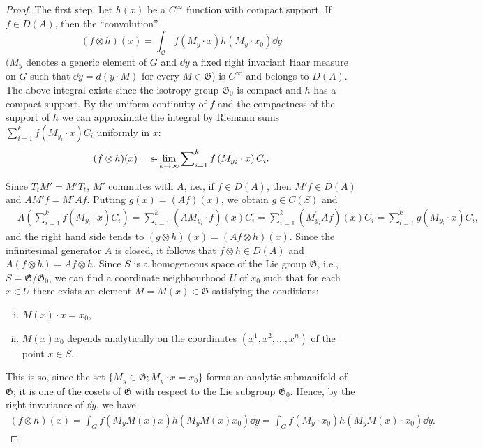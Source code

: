 \begin{proof}
 The first step. Let $h(x)$ be a $C^\infty$ function with compact support. If $f \in D(A)$, then the ``convolution'' 
\begin{equation}\label{eq:XIII.5.9}
(f \otimes h) (x) = \int_ {\mathfrak {G}} f (M _{y} \cdot x) h (M _{y} \cdot x _{0}) \dd y
\end{equation}
$(M_{y}$ denotes a generic element of $G$ and $\dd y$ a fixed right invariant Haar measure on $G$ such that $\dd y = d(y \cdot M)$ for every $M \in \mathfrak{G}$) is $C^{\infty}$ and belongs to $D(A)$. The above integral exists since the isotropy group $\mathfrak{G}_{0}$ is compact and $h$ has a compact support. By the uniform continuity of $f$ and the compactness of the support of $h$ we can approximate the integral by Riemann sums $\sum\limits_{i=1}^{k} f(M_{y_{i}} \cdot x) C_{i}$ uniformly in $x$: 
\[
(f \otimes h) (x) = \text{s-}\lim _{k \rightarrow \infty} \sum\nolimits_{i=1} ^{k} f \left(M _ {y _{i}} \cdot x\right) C _{i}. \]

Since $T_{t}M' = M'T_{t}$, $M'$ commutes with $A$, i.e., if $f \in D(A)$, then $M'f \in D(A)$ and $AM'f = M'Af$. Putting $g(x) = (Af)(x)$, we obtain $g \in C(S)$ and 
\[
\begin{aligned}
&A \left(\sum\limits_{i=1} ^{k} f (M _ {y _{i}} \cdot x) C _{i}\right)  = \sum\limits_{i=1} ^{k} (A M _ {y _{i}} ^{\prime} \cdot f) (x) C _{i} = \sum\limits_{i=1} ^{k} (M _ {y _{i}} ^{\prime} A f) (x) C _{i} = \sum\limits_{i=1} ^{k} g (M _ {y _{i}} \cdot x) C _{i},
\end{aligned}
\]
and the right hand side tends to $(g\otimes h)(x) = (Af\otimes h)(x)$. Since the infinitesimal generator $A$ is closed, it follows that $f\otimes h\in D(A)$ and $A(f\otimes h) = Af\otimes h$. Since $S$ is a homogeneous space of the Lie group $\mathfrak{G}$, i.e., $S = \mathfrak{G} / \mathfrak{G}_0$, we can find a coordinate neighbourhood $U$ of $x_0$ such that for each $x\in U$ there exists an element $M = M(x)\in \mathfrak{G}$ satisfying the conditions: 

\begin{enumerate}[i)]
\item $M(x)\cdot x = x_0,$
\item $M(x) x_0$ depends analytically on the coordinates $(x^1, x^2, \ldots, x^n)$ of the point $x \in S$.
\end{enumerate}


This is so, since the set $\{M_y \in \mathfrak{G}; M_y \cdot x = x_0\}$ forms an analytic submanifold of $\mathfrak{G}$; it is one of the cosets of $\mathfrak{G}$ with respect to the Lie subgroup $\mathfrak{G}_0$. Hence, by the right invariance of $\dd y$, we have 
\[
\begin{gathered}
(f \otimes h) (x) = \int_{G} f (M _{y} M (x) x) h (M _{y} M (x) x _{0}) \dd y = \int_{G} f (M _{y} \cdot x _{0}) h (M _{y} M (x) \cdot x _{0}) \dd y.
\end{gathered}
\]


\end{proof}
